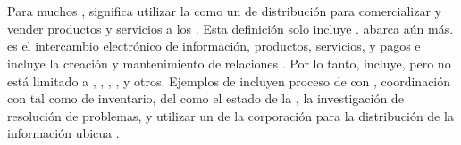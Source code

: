 
%
%

\section{\ecommerceCOM}
Para muchos \businessCOM, \ecommerceCOM significa utilizar la \internetINT como un \channelCOM de distribución para comercializar y vender productos y servicios a los \customersCOM. Esta definición solo incluye \internetINT \commerceCOM. \ecommerceCOM abarca aún más. \ecommerceCOM es el intercambio electrónico de información, productos, servicios, y pagos e incluye la creación y mantenimiento de relaciones \webBasedCPT. Por lo tanto, \ecommerceCOM incluye, pero no está limitado a \internetINT, \intranetsINT, \extranetsINT, \electDataInterCOM, y otros. Ejemplos de \ecommerceCOM incluyen proceso de \transactionsDB con \electronicpayCOM, coordinación con \partnerCPT \businessCOM tal como \managementCOM  de inventario, \selfServiceCPT del \customerCOM como \trackingCPT el estado de la \orderCommerce, la investigación de resolución de problemas, y utilizar un \intranetINT de la corporación para la distribución de la información ubicua \cite{fruhling2000impact}.






